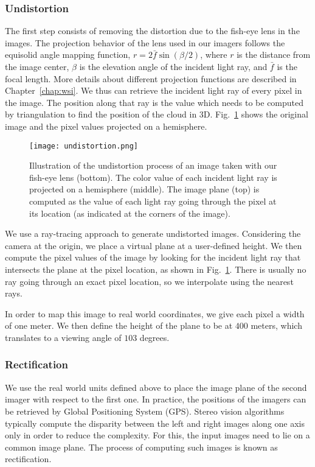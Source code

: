 \subsubsection{Undistortion}
The first step consists of removing the distortion due to the fish-eye lens in the images. The projection behavior of the lens used in our imagers follows the equisolid angle mapping function, $r=2\bar{f}\sin(\beta/2)$, where $r$ is the distance from the image center, $\beta$ is the elevation angle of the incident light ray, and $\bar{f}$ is the focal length. More details about different projection functions are described in Chapter~\ref{chap:wsi}. We thus can retrieve the incident light ray of every pixel in the image. The position along that ray is the value which needs to be computed by triangulation to find the position of the cloud in 3D. Fig.~\ref{fig:undistortion} shows the original image and the pixel values projected on a hemisphere.

\begin{figure}[htb]
\centering
\texttt{[image: undistortion.png]}
\caption[Illustration of the undistortion process of an image taken with our fish-eye lens of WAHRSIS.]{Illustration of the undistortion process of an image taken with our fish-eye lens (bottom). The color value of each incident light ray is projected on a hemisphere (middle). The image plane (top) is computed as the value of each light ray going through the pixel at its location (as indicated at the corners of the image).}\label{fig:undistortion}
\end{figure}

We use a ray-tracing approach to generate undistorted images. Considering the camera at the origin, we place a virtual plane at a user-defined height. We then compute the pixel values of the image by looking for the incident light ray that intersects the plane at the pixel location, as shown in Fig.~\ref{fig:undistortion}. There is usually no ray going through an exact pixel location, so we interpolate using the nearest rays.

In order to map this image to real world coordinates, we give each pixel a width of one meter. We then define the height of the plane to be at $400$ meters, which translates to a viewing angle of $103$ degrees.

\subsubsection{Rectification}
We use the real world units defined above to place the image plane of the second imager with respect to the first one. In practice, the positions of the imagers can be retrieved by Global Positioning System (GPS). Stereo vision algorithms typically compute the disparity between the left and right images along one axis only in order to reduce the complexity. For this, the input images need to lie on a common image plane. The process of computing such images is known as rectification.	

